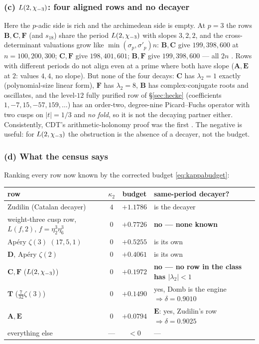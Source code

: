 \subsubsection*{(c) $L(2,\chi_{-3})$: four aligned rows and no decayer}

Here the $p$-adic side is rich and the archimedean side is empty.  At $p=3$
the rows $\mathbf B,\mathbf C,\mathbf F$ (and $s_{18}$) share the period
$L(2,\chi_{-3})$ with slopes $3,2,2$, and the cross-determinant valuations grow
like $\min(\sigma_p,\sigma'_p)n$: $\mathbf B,\mathbf C$ give
$199,398,600$ at $n=100,200,300$; $\mathbf C,\mathbf F$ give $198,401,601$;
$\mathbf B,\mathbf F$ give $199,398,600$ --- all $2n$
.  Rows with different periods do not align even at a
prime where both have slope ($\mathbf A,\mathbf E$ at $2$: values $4,4$, no
slope).  But none of the four decays: $\mathbf C$ has $\lambda_2=1$ exactly
(polynomial-size linear form), $\mathbf F$ has $\lambda_2=8$, $\mathbf B$ has
complex-conjugate roots and oscillates, and the level-$12$ fully purified row
of \S\ref{sec:hecke} (coefficients $1,-7,15,-57,159,\dots$) has an order-two,
degree-nine Picard--Fuchs operator with two cusps on $|t|=1/3$ and \emph{no
fold}, so it is not the decaying partner either.  Consistently, CDT's
arithmetic-holonomy proof was the first \cite{CDT2024}.  The negative is
useful: for $L(2,\chi_{-3})$ the obstruction is the absence of a decayer, not the
budget.

\subsubsection*{(d) What the census says}

Ranking every row now known by the corrected budget \eqref{eq:kappabudget}:

\begin{center}
\renewcommand{\arraystretch}{1.2}
\begin{tabular}{@{}l c c l@{}}
\toprule
row & $\kappa_2$ & budget & same-period decayer?\\
\midrule
Zudilin (Catalan decayer) & $4$ & $+1.1786$ & is the decayer\\
weight-three cusp row, $L(f,2)$, $f=\eta_2^3\eta_6^3$ & $0$ & $+0.7726$ &
\textbf{no --- none known}\\
Ap\'ery $\zeta(3)$ $(17,5,1)$ & $0$ & $+0.5255$ & is its own\\
$\mathbf D$, Ap\'ery $\zeta(2)$ & $0$ & $+0.4061$ & is its own\\
$\mathbf C,\mathbf F$ ($L(2,\chi_{-3})$) & $0$ & $+0.1972$ &
\textbf{no --- no row in the class has $|\lambda_2|<1$}\\
$\mathbf T$ ($\tfrac7{32}\zeta(3)$) & $0$ & $+0.1490$ &
yes, Domb is the engine $\Rightarrow\delta=0.9010$\\
$\mathbf A,\mathbf E$ & $0$ & $+0.0794$ &
$\mathbf E$: yes, Zudilin's row $\Rightarrow\delta=0.9025$\\
everything else & --- & $<0$ & ---\\
\bottomrule
\end{tabular}
\end{center}

